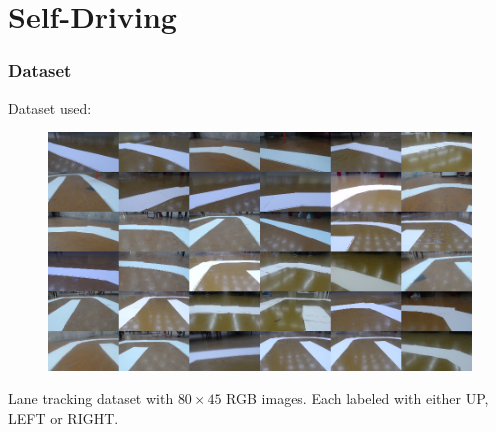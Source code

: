 \documentclass{beamer}
\begin{document}
\section{Self-Driving}

\begin{frame}
  \frametitle{Dataset}

  Dataset used: \cite{self-driving}

  \begin{figure}
    \centering\includegraphics[height=0.5\textheight]{imgs/montage_raw.png}
  \end{figure}

  Lane tracking dataset with $80\times 45$ RGB images. Each labeled with either UP, LEFT or RIGHT.
\end{frame}
\end{document}
